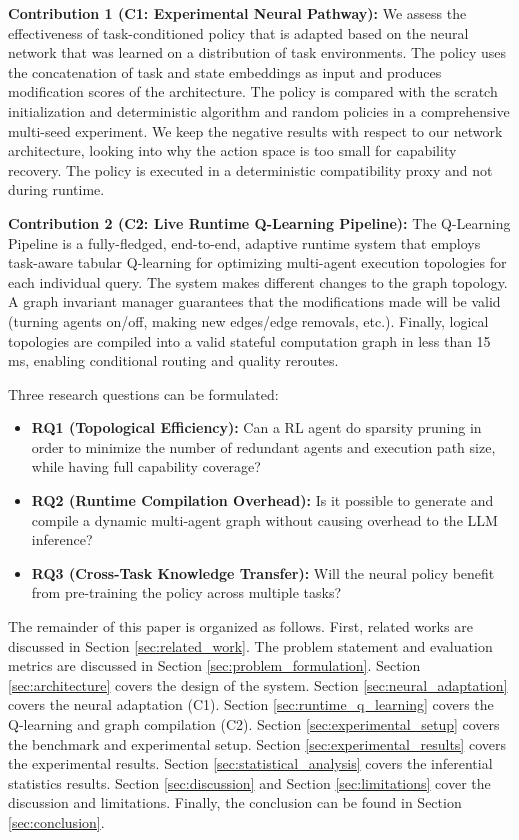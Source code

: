 \documentclass[conference]{IEEEtran}
\begin{document}
\textbf{Contribution 1 (C1: Experimental Neural Pathway):} We assess the effectiveness of task-conditioned policy that is adapted based on the neural network that was learned on a distribution of task environments. The policy uses the concatenation of task and state embeddings as input and produces modification scores of the architecture. The policy is compared with the scratch initialization and deterministic algorithm and random policies in a comprehensive multi-seed experiment. We keep the negative results with respect to our network architecture, looking into why the action space is too small for capability recovery. The policy is executed in a deterministic compatibility proxy and not during runtime.

\textbf{Contribution 2 (C2: Live Runtime Q-Learning Pipeline):} The Q-Learning Pipeline is a fully-fledged, end-to-end, adaptive runtime system that employs task-aware tabular Q-learning for optimizing multi-agent execution topologies for each individual query. The system makes different changes to the graph topology. A graph invariant manager guarantees that the modifications made will be valid (turning agents on/off, making new edges/edge removals, etc.). Finally, logical topologies are compiled into a valid stateful computation graph in less than 15\,ms, enabling conditional routing and quality reroutes.

Three research questions can be formulated:
\begin{itemize}[leftmargin=*]
    \item \textbf{RQ1 (Topological Efficiency):} Can a RL agent do sparsity pruning in order to minimize the number of redundant agents and execution path size, while having full capability coverage?
    \item \textbf{RQ2 (Runtime Compilation Overhead):} Is it possible to generate and compile a dynamic multi-agent graph without causing overhead to the LLM inference?
    \item \textbf{RQ3 (Cross-Task Knowledge Transfer):} Will the neural policy benefit from pre-training the policy across multiple tasks?
\end{itemize}

The remainder of this paper is organized as follows. First, related works are discussed in Section \ref{sec:related_work}. The problem statement and evaluation metrics are discussed in Section \ref{sec:problem_formulation}. Section \ref{sec:architecture} covers the design of the system. Section \ref{sec:neural_adaptation} covers the neural adaptation (C1). Section \ref{sec:runtime_q_learning} covers the Q-learning and graph compilation (C2). Section \ref{sec:experimental_setup} covers the benchmark and experimental setup. Section \ref{sec:experimental_results} covers the experimental results. Section \ref{sec:statistical_analysis} covers the inferential statistics results. Section \ref{sec:discussion} and Section \ref{sec:limitations} cover the discussion and limitations. Finally, the conclusion can be found in Section \ref{sec:conclusion}.
\end{document}

